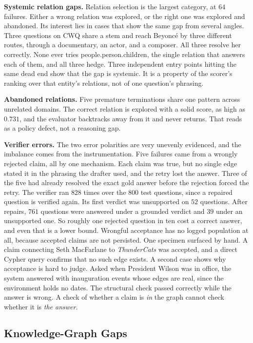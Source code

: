 \textbf{Systemic relation gaps.} Relation selection is the largest category, at
$64$ failures. Either a wrong relation was explored, or the right one was
explored and abandoned. Its interest lies in cases that show the same gap from
several angles. Three questions on CWQ share a stem and reach Beyonc\'{e} by
three different routes, through a documentary, an actor, and a composer. All
three resolve her correctly. None ever tries \textsf{people.person.children},
the single relation that answers each of them, and all three hedge. Three
independent entry points hitting the same dead end show that the gap is
systemic. It is a property of the scorer's ranking over that entity's relations,
not of one question's phrasing.

\textbf{Abandoned relations.} Five premature terminations share one pattern
across unrelated domains. The correct relation is explored with a solid score,
as high as $0.731$, and the evaluator backtracks away from it and never returns.
That reads as a policy defect, not a reasoning gap.

\textbf{Verifier errors.} The two error polarities are very unevenly evidenced,
and the imbalance comes from the instrumentation. Five failures came from a
wrongly rejected claim, all by one mechanism. Each claim was true, but no single
edge stated it in the phrasing the drafter used, and the retry lost the answer.
Three of the five had already resolved the exact gold answer before the
rejection forced the retry. The verifier ran $828$ times over the $800$ test
questions, since a repaired question is verified again. Its first verdict was
unsupported on $52$ questions. After repairs, $761$ questions were answered
under a grounded verdict and $39$ under an unsupported one. So roughly one
rejected question in ten cost a correct answer, and even that is a lower bound.
Wrongful acceptance has no logged population at all, because accepted claims are
not persisted. One specimen surfaced by hand. A claim connecting Seth MacFarlane
to \emph{ThunderCats} was accepted, and a direct Cypher query confirms that no
such edge exists. A second case shows why acceptance is hard to judge. Asked
when President Wilson was in office, the system answered with inauguration
events whose edges are real, since the environment holds no dates. The
structural check passed correctly while the answer is wrong. A check of whether
a claim is \emph{in} the graph cannot check whether it is \emph{the answer}.

\subsection{Knowledge-Graph Gaps}

